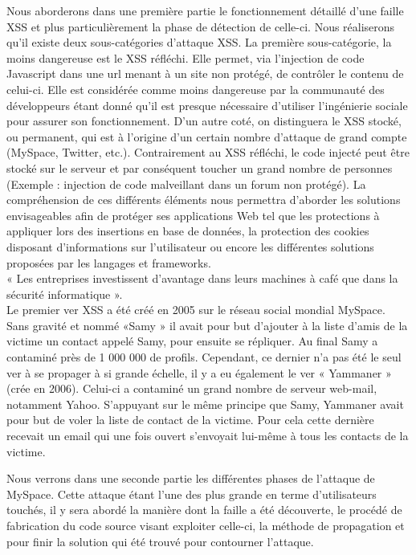 \documentclass[a4paper,12pt]{report}
\begin{document}
Nous aborderons dans une première partie le fonctionnement détaillé d'une faille XSS et plus particulièrement la phase de détection de celle-ci. Nous réaliserons qu'il existe deux sous-catégories d'attaque XSS. La première sous-catégorie, la moins dangereuse est le XSS réfléchi. Elle permet, via l'injection de code Javascript dans une url menant à un site non protégé, de contrôler le contenu de celui-ci. Elle est considérée comme moins dangereuse par la communauté des développeurs étant donné qu'il est presque nécessaire d'utiliser l'ingénierie sociale pour assurer son fonctionnement. D'un autre coté, on distinguera le XSS stocké, ou permanent, qui est à l'origine d'un certain nombre d'attaque de grand compte (MySpace, Twitter, etc.). Contrairement au XSS réfléchi, le code injecté peut être stocké sur le serveur et par conséquent toucher un grand nombre de personnes (Exemple : injection de code malveillant dans un forum non protégé). La compréhension de ces différents éléments nous permettra d'aborder les solutions envisageables afin de protéger ses applications Web tel que les protections à appliquer lors des insertions en base de données, la protection des cookies disposant d'informations sur l'utilisateur ou encore les différentes solutions proposées par les langages et frameworks.  \\

« Les entreprises investissent d'avantage dans leurs machines à café que dans la sécurité informatique ».\\

Le premier ver XSS a été créé en 2005 sur le réseau social mondial MySpace. Sans gravité et nommé «Samy » il avait pour but d’ajouter à la liste d’amis de la victime un contact appelé Samy, pour ensuite se répliquer. Au final Samy a contaminé près de 1 000 000 de profils. Cependant, ce dernier n’a pas été le seul ver à se propager à si grande échelle, il y a eu également le ver « Yammaner » (crée en 2006). Celui-ci a contaminé un grand nombre de serveur web-mail, notamment Yahoo. S’appuyant sur le même principe que Samy, Yammaner avait pour but de voler la liste de contact de la victime. Pour cela cette dernière recevait un email qui une fois ouvert s’envoyait lui-même à tous les contacts de la victime.

Nous verrons dans une seconde partie les différentes phases de l'attaque de MySpace. Cette attaque étant l'une des plus grande en terme d'utilisateurs touchés, il y sera abordé la manière dont la faille a été découverte, le procédé de fabrication du code source visant exploiter celle-ci, la méthode de propagation et pour finir la solution qui été trouvé pour contourner l'attaque.
\end{document}
